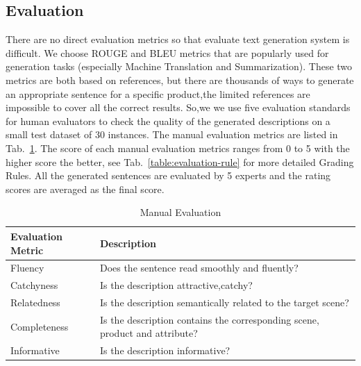 \documentclass[sigconf]{acmart}
\begin{document}
\subsection{Evaluation}
There are no direct evaluation metrics so that evaluate text generation system is difficult.  We choose ROUGE \cite{lin2004rouge} and BLEU \cite{papineni2002bleu} metrics that are popularly used for generation tasks (especially Machine Translation and Summarization). These two metrics are both based on references, but there are thousands of ways to generate an appropriate sentence for a specific product,the limited references are impossible to cover all the correct results. So,we we use five evaluation standards for human evaluators to check the quality of the generated descriptions on a small test dataset of 30 instances. The manual evaluation metrics are listed in Tab.~\ref{table:evaluation}. The score of each manual evaluation metrics ranges from 0 to 5 with the higher score the better, see Tab.~\ref{table:evaluation-rule} for more detailed Grading Rules. All the generated sentences are evaluated by 5 experts and the rating scores are averaged as the final score.

\begin{table}
\caption{Manual Evaluation }\label{table:evaluation}
\begin{center}
\begin{tabular}{p{2.5cm}p{5cm}}
    \toprule
    Evaluation Metric & Description \\
    \midrule
    Fluency \cite{wang2016chinese} & Does the sentence read smoothly and fluently? \\
    Catchyness \cite{munigala2018persuaide} & Is the description attractive,catchy? \\
    Relatedness \cite{munigala2018persuaide} & Is the description semantically related to the target scene? \\
    Completeness & Is the description contains the corresponding scene, product and attribute? \\
    Informative & Is the description informative?\\
    \bottomrule
\end{tabular}
\end{center}
\end{table} 
\end{document}
